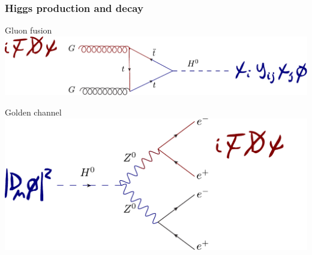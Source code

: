 \documentclass[%
xcolor=pdftex,dvipsnames,table%
]{beamer}
\begin{document}
\begin{frame}
  \frametitle{Higgs production and decay}
  \begin{block}{Gluon fusion}
    \includegraphics[scale=0.4]{gluonfusion}
  \end{block}
  \begin{block}{Golden channel}
    \includegraphics[scale=0.4]{golden_channel}
  \end{block}
\end{frame}
{
\begin{frame}[plain]
\end{frame}
}
\end{document}
